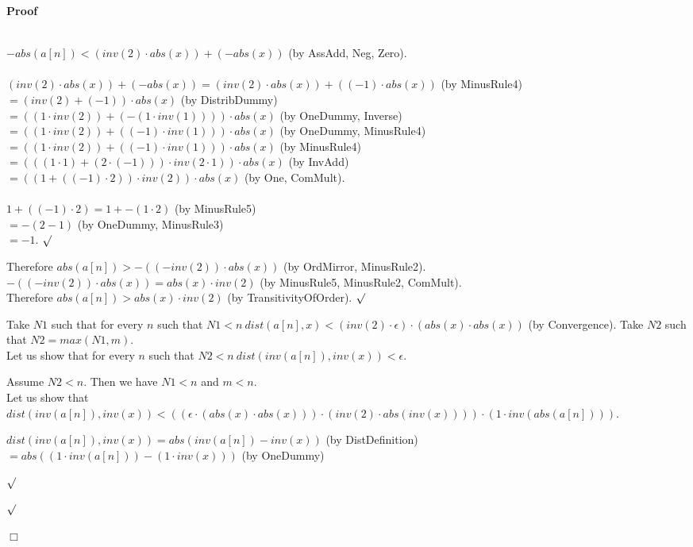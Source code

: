 \documentclass{article}
\newenvironment{forthel}{\begin{leftbar}}{\end{leftbar}}
\newenvironment{proof}{\noindent\textbf{Proof\ }}{\hspace*{\fill}$\Box$\medskip}
\newenvironment{subproof}{\begin{list}{}{}
		\item[\text{Proof}]}{\hfill $\surd$ \end{list}}
\newcommand{\dotequal}{=}
\begin{document}
\begin{forthel}
\begin{proof}
\begin{subproof}
\begin{subproof}
	\\$-abs(a[n]) < (inv(2) \cdot abs(x)) + (-abs(x))$ (by AssAdd, Neg, Zero).
	\\\\$(inv(2) \cdot abs(x)) + (-abs(x)) \dotequal (inv(2) \cdot abs(x)) + ((-1) \cdot abs(x))$ (by MinusRule4)
	\\$\dotequal (inv(2) + (-1)) \cdot abs(x)$ (by DistribDummy)
	\\$\dotequal ((1 \cdot inv(2)) + (-(1 \cdot inv(1)))) \cdot abs(x)$ (by OneDummy, Inverse)
	\\$\dotequal ((1 \cdot inv(2)) + ((-1) \cdot inv(1))) \cdot abs(x)$ (by OneDummy, MinusRule4)
	\\$\dotequal ((1 \cdot inv(2)) + ((-1) \cdot inv(1))) \cdot abs(x)$ (by MinusRule4)
	\\$\dotequal (((1 \cdot 1) + (2 \cdot (-1))) \cdot inv(2 \cdot 1)) \cdot abs(x)$ (by InvAdd)
	\\$\dotequal ((1 + ((-1) \cdot 2)) \cdot inv(2)) \cdot abs(x)$ (by One, ComMult).
	\\\\$1 + ((-1) \cdot 2) \dotequal 1 + -(1 \cdot 2)$ (by MinusRule5)
	\\$\dotequal -(2 - 1)$ (by OneDummy, MinusRule3)
	\\$\dotequal -1$. 
	\end{subproof}
    Therefore $abs(a[n]) > -((-inv(2)) \cdot abs(x))$ (by OrdMirror, MinusRule2).
    \\$-((-inv(2)) \cdot abs(x)) = abs(x) \cdot inv(2)$ (by MinusRule5, MinusRule2, ComMult).
    \\Therefore $abs(a[n]) > abs(x) \cdot inv(2)$ (by TransitivityOfOrder).
	\end{subproof}
	Take $N1$ such that for every $n$ such that $N1 < n \ dist(a[n],x) < (inv(2) \cdot \epsilon) \cdot (abs(x) \cdot abs(x))$ (by Convergence). 
	Take $N2$ such that $N2 = max(N1,m)$.
	\\Let us show that for every $n$ such that $N2 < n \ dist(inv(a[n]),inv(x)) < \epsilon$.
	\begin{subproof}
	Assume $N2 < n$.
	Then we have $N1 < n$ and $m < n$.
	\\Let us show that $dist(inv(a[n]),inv(x)) < ((\epsilon \cdot (abs(x) \cdot abs(x))) \cdot (inv(2) \cdot abs(inv(x)))) \cdot (1 \cdot inv(abs(a[n])))$.
	\begin{subproof}
	$dist(inv(a[n]),inv(x)) \dotequal abs(inv(a[n]) - inv(x))$ (by DistDefinition)
	\\$\dotequal abs((1 \cdot inv(a[n])) - (1 \cdot inv(x)))$ (by OneDummy)

\end{subproof}
\end{subproof}
\end{proof}
\end{forthel}
\end{document}
